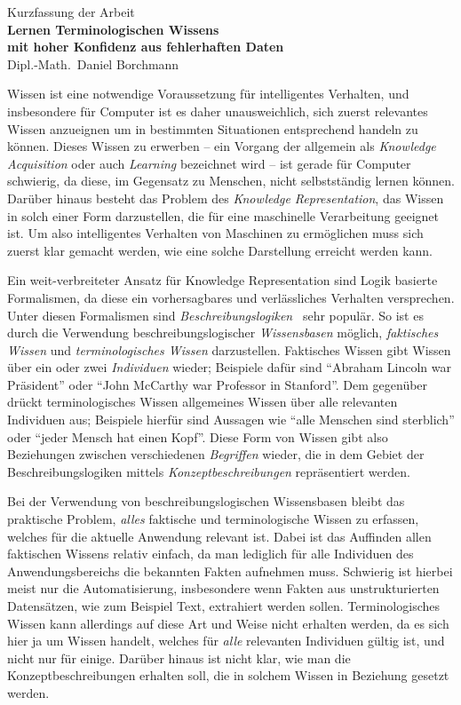 \documentclass[ngerman,fleqn,DIV=12]{scrartcl}
\begin{document}
\medskip
\begin{center}
  \normalsize Kurzfassung der Arbeit\\
  \LARGE\textbf{Lernen Terminologischen Wissens\\ mit hoher Konfidenz aus fehlerhaften Daten}\\
  \bigskip%
  \large Dipl.-Math.\ Daniel Borchmann
\end{center}
\bigskip
\bigskip

\noindent
Wissen ist eine notwendige Voraussetzung für intelligentes Verhalten, und insbesondere für
Computer ist es daher unausweichlich, sich zuerst relevantes Wissen anzueignen um in
bestimmten Situationen entsprechend handeln zu können.  Dieses Wissen zu erwerben -- ein
Vorgang der allgemein als \emph{Knowledge Acquisition} oder auch \emph{Learning}
bezeichnet wird -- ist gerade für Computer schwierig, da diese, im Gegensatz zu Menschen,
nicht selbstständig lernen können.  Darüber hinaus besteht das Problem des \emph{Knowledge
  Representation}, \dh das Wissen in solch einer Form darzustellen, die für eine
maschinelle Verarbeitung geeignet ist.  Um also intelligentes Verhalten von Maschinen zu
ermöglichen muss sich zuerst klar gemacht werden, wie eine solche Darstellung erreicht
werden kann.

Ein weit-verbreiteter Ansatz für Knowledge Representation sind Logik basierte Formalismen,
da diese ein vorhersagbares und verlässliches Verhalten versprechen.  Unter diesen
Formalismen sind \emph{Beschreibungslogiken}~\cite{DLhandbook} sehr populär.  So ist es
durch die Verwendung beschreibungslogischer \emph{Wissensbasen} möglich, \emph{faktisches
  Wissen} und \emph{terminologisches Wissen} darzustellen.  Faktisches Wissen gibt Wissen
über ein oder zwei \emph{Individuen} wieder; Beispiele dafür sind \enquote{Abraham Lincoln
  war Präsident} oder \enquote{John McCarthy war Professor in Stanford}.  Dem gegenüber
drückt terminologisches Wissen allgemeines Wissen über alle relevanten Individuen aus;
Beispiele hierfür sind Aussagen wie \enquote{alle Menschen sind sterblich} oder
\enquote{jeder Mensch hat einen Kopf}.  Diese Form von Wissen gibt also Beziehungen
zwischen verschiedenen \emph{Begriffen} wieder, die in dem Gebiet der Beschreibungslogiken
mittels \emph{Konzeptbeschreibungen} repräsentiert werden.

Bei der Verwendung von beschreibungslogischen Wissensbasen bleibt das praktische Problem,
\emph{alles} faktische und terminologische Wissen zu erfassen, welches für die aktuelle
Anwendung relevant ist.  Dabei ist das Auffinden allen faktischen Wissens relativ einfach,
da man lediglich für alle Individuen des Anwendungsbereichs die bekannten Fakten aufnehmen
muss.  Schwierig ist hierbei meist nur die Automatisierung, insbesondere wenn Fakten aus
unstrukturierten Datensätzen, wie zum Beispiel Text, extrahiert werden sollen.
Terminologisches Wissen kann allerdings auf diese Art und Weise nicht erhalten werden, da
es sich hier ja um Wissen handelt, welches für \emph{alle} relevanten Individuen gültig
ist, und nicht nur für einige.  Darüber hinaus ist nicht klar, wie man die
Konzeptbeschreibungen erhalten soll, die in solchem Wissen in Beziehung gesetzt werden.
\end{document}
